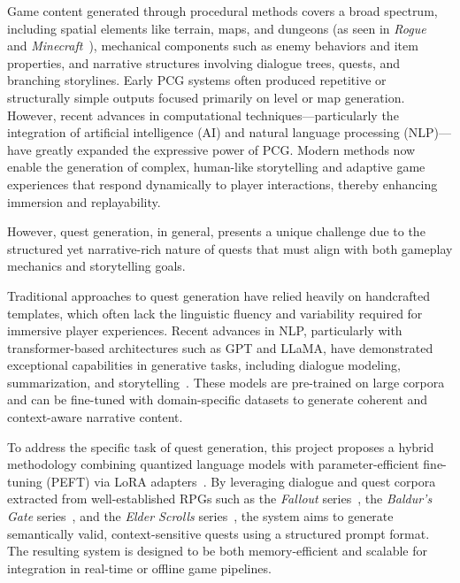 Game content generated through procedural methods covers a broad spectrum, including
spatial elements like terrain, maps, and dungeons (as seen in \textit{Rogue}~\cite{rogue1980} and
\textit{Minecraft}~\cite{minecraft}), mechanical components such as enemy behaviors and item properties, and
narrative structures involving dialogue trees, quests, and branching storylines. Early PCG
systems often produced repetitive or structurally simple outputs focused primarily on level
or map generation. However, recent advances in computational techniques—particularly
the integration of artificial intelligence (AI) and natural language processing (NLP)—have
greatly expanded the expressive power of PCG. Modern methods now enable the generation
of complex, human-like storytelling and adaptive game experiences that respond
dynamically to player interactions, thereby enhancing immersion and replayability.

However, quest generation, in general, presents a unique challenge due to the structured
yet narrative-rich nature of quests that must align with both gameplay mechanics
and storytelling goals.

Traditional approaches to quest generation have relied heavily on handcrafted templates,
which often lack the linguistic fluency and variability required for immersive player
experiences. Recent advances in NLP, particularly with transformer-based architectures
such as GPT and LLaMA, have demonstrated exceptional capabilities in generative tasks,
including dialogue modeling, summarization, and storytelling~\cite{vaswani2017attention,brown2020language}. These models are pre-trained
on large corpora and can be fine-tuned with domain-specific datasets to generate
coherent and context-aware narrative content.

To address the specific task of quest generation, this project proposes a hybrid methodology
combining quantized language models with parameter-efficient fine-tuning (PEFT)
via LoRA adapters~\cite{peft,hu2022lora,dettmers2023qlora}. By leveraging dialogue and quest corpora extracted from well-established
RPGs such as the \textit{Fallout} series~\cite{fallout1,fallout2}, the \textit{Baldur's Gate} series~\cite{baldursgate,baldursgate2shadowsofamn}, and
the \textit{Elder Scrolls} series~\cite{theelderscrollsivoblivion,theelderscrollsvskyrim}, the system aims to generate semantically valid, context-sensitive
quests using a structured prompt format. The resulting system is designed to be
both memory-efficient and scalable for integration in real-time or offline game pipelines.

